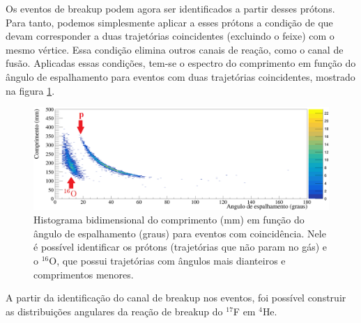 \documentclass[a4paper,12pt,oneside]{book}
\begin{document}

\par Os eventos de breakup podem agora ser identificados a partir desses prótons. Para tanto, podemos simplesmente aplicar a esses prótons a condição de que devam corresponder a duas trajetórias coincidentes (excluindo o feixe) com o mesmo vértice. Essa condição elimina outros canais de reação, como o canal de fusão. Aplicadas essas condições, tem-se o espectro do comprimento em função do ângulo de espalhamento para eventos com duas trajetórias coincidentes, mostrado na figura \ref{fig:comp_vs_ang_coinc}. 



\begin{figure}[H]
    \centering
    \includegraphics[scale = 1., width=\columnwidth]{figs/comp_vs_ang_n2_coinc_cut12.png}
    \caption{Histograma bidimensional do comprimento (mm) em função do ângulo de espalhamento (graus) para eventos com coincidência. Nele é possível identificar os prótons (trajetórias que não param no gás) e o $^{16}$O, que possui trajetórias com ângulos mais dianteiros e comprimentos menores.}
    \label{fig:comp_vs_ang_coinc}
\end{figure}

\par A partir da identificação do canal de breakup nos eventos, foi possível construir as distribuições angulares da reação de breakup do $^{17}$F em $^4$He.
\end{document}
